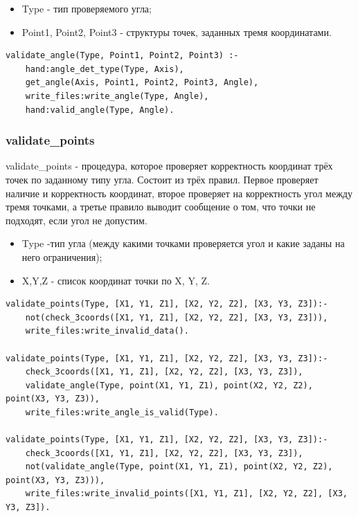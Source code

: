\begin{itemize}
	\item Type - тип проверяемого угла;
	\item Point1, Point2, Point3 - структуры точек, заданных тремя координатами.
\end{itemize}

\begin{lstlisting}[caption=Реализация правила validate\_angle, label=rules:validateangle]
validate_angle(Type, Point1, Point2, Point3) :-
	hand:angle_det_type(Type, Axis),
	get_angle(Axis, Point1, Point2, Point3, Angle),
	write_files:write_angle(Type, Angle),
	hand:valid_angle(Type, Angle).
\end{lstlisting}

\subsubsection{validate\_points}
\hspace{0.6cm} validate\_points - процедура, которое проверяет корректность координат трёх точек по заданному типу угла. Состоит из трёх правил. Первое проверяет наличие и корректность координат, второе проверяет на корректность угол между тремя точками, а третье правило выводит сообщение о том, что точки не подходят, если угол не допустим.

\begin{itemize}
	\item Type -тип угла (между какими точками проверяется угол и какие заданы на него ограничения);
	\item X,Y,Z - список координат точки по X, Y, Z.
\end{itemize}

\begin{lstlisting}[caption=Реализация правила validate\_points, label=rules:validatepoints]
validate_points(Type, [X1, Y1, Z1], [X2, Y2, Z2], [X3, Y3, Z3]):-
	not(check_3coords([X1, Y1, Z1], [X2, Y2, Z2], [X3, Y3, Z3])),
	write_files:write_invalid_data().

validate_points(Type, [X1, Y1, Z1], [X2, Y2, Z2], [X3, Y3, Z3]):-
	check_3coords([X1, Y1, Z1], [X2, Y2, Z2], [X3, Y3, Z3]),
	validate_angle(Type, point(X1, Y1, Z1), point(X2, Y2, Z2), point(X3, Y3, Z3)),
	write_files:write_angle_is_valid(Type).
	
validate_points(Type, [X1, Y1, Z1], [X2, Y2, Z2], [X3, Y3, Z3]):-
	check_3coords([X1, Y1, Z1], [X2, Y2, Z2], [X3, Y3, Z3]),
	not(validate_angle(Type, point(X1, Y1, Z1), point(X2, Y2, Z2), point(X3, Y3, Z3))),
	write_files:write_invalid_points([X1, Y1, Z1], [X2, Y2, Z2], [X3, Y3, Z3]).
\end{lstlisting}

